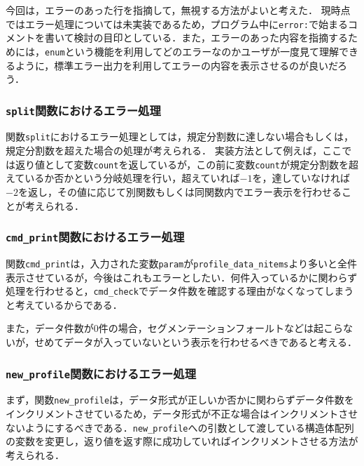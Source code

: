 \documentclass[a4j,11pt]{jarticle}
\begin{document}
今回は，エラーのあった行を指摘して，無視する方法がよいと考えた．
現時点ではエラー処理については未実装であるため，プログラム中に\verb|error:|で始まるコメントを書いて検討の目印としている．また，エラーのあった内容を指摘するためには，\verb|enum|という機能を利用してどのエラーなのかユーザが一度見て理解できるように，標準エラー出力を利用してエラーの内容を表示させるのが良いだろう．

\subsubsection{\texttt{split}関数におけるエラー処理}
関数\verb|split|におけるエラー処理としては，規定分割数に達しない場合もしくは，規定分割数を超えた場合の処理が考えられる．
実装方法として例えば，ここでは返り値として変数\verb|count|を返しているが，この前に変数\verb|count|が規定分割数を超えているか否かという分岐処理を行い，超えていれば$-1$を，達していなければ$-2$を返し，その値に応じて別関数もしくは同関数内でエラー表示を行わせることが考えられる．
\subsubsection{\texttt{cmd\_print}関数におけるエラー処理}
関数\verb|cmd_print|は，入力された変数\verb|param|が\verb|profile_data_nitems|より多いと全件表示させているが，今後はこれもエラーとしたい．何件入っているかに関わらず処理を行わせると，\verb|cmd_check|でデータ件数を確認する理由がなくなってしまうと考えているからである．

また，データ件数が$0$件の場合，セグメンテーションフォールトなどは起こらないが，せめてデータが入っていないという表示を行わせるべきであると考える．
\subsubsection{\texttt{new\_profile}関数におけるエラー処理}

まず，関数\verb|new_profile|は，データ形式が正しいか否かに関わらずデータ件数をインクリメントさせているため，データ形式が不正な場合はインクリメントさせないようにするべきである．\verb|new_profile|への引数として渡している構造体配列の変数を変更し，返り値を返す際に成功していればインクリメントさせる方法が考えられる．
\end{document}
